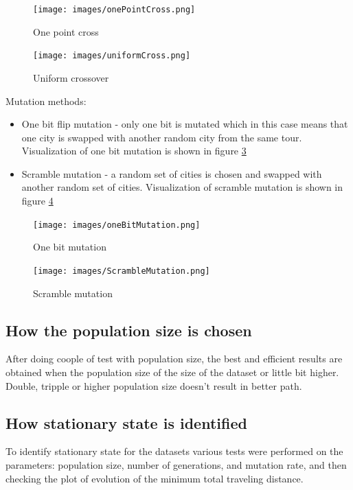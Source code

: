 \documentclass[12pt]{report}
\begin{document}
    \begin{figure}
        \centering
        \texttt{[image: images/onePointCross.png]}
        \caption{One point cross}
        \label{fig:OnePointCross}
    \end{figure}

    \begin{figure}
        \centering
        \texttt{[image: images/uniformCross.png]}
        \caption{Uniform crossover}
        \label{fig:uniformCrossover}
    \end{figure}
    \noindent Mutation methods: \cite{MutationSource}
    \begin{itemize}
        \item One bit flip mutation - only one bit is mutated which in this case means that one city is swapped with another random city from the same tour. Visualization of one bit mutation is shown in figure \ref{fig:OneBitMutation}
        \item Scramble mutation - a random set of cities is chosen and swapped with another random set of cities. Visualization of scramble mutation is shown in figure \ref{fig:ScrambleMutation}
    \end{itemize}

    \begin{figure}
        \centering
        \texttt{[image: images/oneBitMutation.png]}
        \caption{One bit mutation}
        \label{fig:OneBitMutation}
    \end{figure}
    
    \begin{figure}
        \centering
        \texttt{[image: images/ScrambleMutation.png]}
        \caption{Scramble mutation}
        \label{fig:ScrambleMutation}
    \end{figure}
    
    \subsection{How the population size is chosen}
    After doing coople of test with population size, the best and efficient results are obtained when the population size of the size of the dataset or little bit higher. Double, tripple or higher population size doesn't result in better path.

    \subsection{How stationary state is identified}
    To identify stationary state for the datasets various tests were performed on the parameters: population size, number of generations, and mutation rate, and then checking the plot of evolution of the minimum total traveling distance. 
\end{document}

